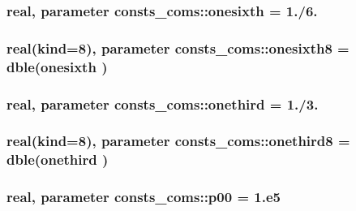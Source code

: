 \subsubsection[{\texorpdfstring{onesixth}{onesixth}}]{\setlength{\rightskip}{0pt plus 5cm}real, parameter consts\+\_\+coms\+::onesixth = 1./6.}\hypertarget{namespaceconsts__coms_ada6e5b6811f533bff45549fe556966ee}{}\label{namespaceconsts__coms_ada6e5b6811f533bff45549fe556966ee}
\subsubsection[{\texorpdfstring{onesixth8}{onesixth8}}]{\setlength{\rightskip}{0pt plus 5cm}real(kind=8), parameter consts\+\_\+coms\+::onesixth8 = dble({\bf onesixth} )}\hypertarget{namespaceconsts__coms_a533ba43ea618917f7a64b64e74cac72e}{}\label{namespaceconsts__coms_a533ba43ea618917f7a64b64e74cac72e}
\subsubsection[{\texorpdfstring{onethird}{onethird}}]{\setlength{\rightskip}{0pt plus 5cm}real, parameter consts\+\_\+coms\+::onethird = 1./3.}\hypertarget{namespaceconsts__coms_a77951232affbc4dc54bd20a0dfe1244f}{}\label{namespaceconsts__coms_a77951232affbc4dc54bd20a0dfe1244f}
\subsubsection[{\texorpdfstring{onethird8}{onethird8}}]{\setlength{\rightskip}{0pt plus 5cm}real(kind=8), parameter consts\+\_\+coms\+::onethird8 = dble({\bf onethird} )}\hypertarget{namespaceconsts__coms_a56785c4a5099759491b652bdcd9439f0}{}\label{namespaceconsts__coms_a56785c4a5099759491b652bdcd9439f0}
\subsubsection[{\texorpdfstring{p00}{p00}}]{\setlength{\rightskip}{0pt plus 5cm}real, parameter consts\+\_\+coms\+::p00 = 1.e5}\hypertarget{namespaceconsts__coms_a2e56fe1bdb69a647d3bdfd214a331e4a}{}\label{namespaceconsts__coms_a2e56fe1bdb69a647d3bdfd214a331e4a}
